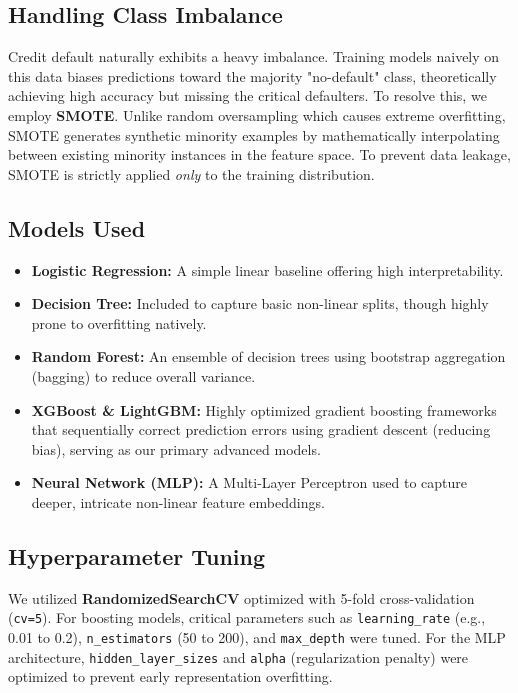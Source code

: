 \documentclass[12pt,a4paper]{article}
\begin{document}
\subsection{Handling Class Imbalance}
Credit default naturally exhibits a heavy imbalance. Training models naively on this data biases predictions toward the majority "no-default" class, theoretically achieving high accuracy but missing the critical defaulters. To resolve this, we employ \textbf{SMOTE}. Unlike random oversampling which causes extreme overfitting, SMOTE generates synthetic minority examples by mathematically interpolating between existing minority instances in the feature space. To prevent data leakage, SMOTE is strictly applied \textit{only} to the training distribution.

\subsection{Models Used}
\begin{itemize}
    \item \textbf{Logistic Regression:} A simple linear baseline offering high interpretability.
    \item \textbf{Decision Tree:} Included to capture basic non-linear splits, though highly prone to overfitting natively.
    \item \textbf{Random Forest:} An ensemble of decision trees using bootstrap aggregation (bagging) to reduce overall variance.
    \item \textbf{XGBoost \& LightGBM:} Highly optimized gradient boosting frameworks that sequentially correct prediction errors using gradient descent (reducing bias), serving as our primary advanced models.
    \item \textbf{Neural Network (MLP):} A Multi-Layer Perceptron used to capture deeper, intricate non-linear feature embeddings.
\end{itemize}

\subsection{Hyperparameter Tuning}
We utilized \textbf{RandomizedSearchCV} optimized with 5-fold cross-validation (\texttt{cv=5}). For boosting models, critical parameters such as \texttt{learning\_rate} (e.g., 0.01 to 0.2), \texttt{n\_estimators} (50 to 200), and \texttt{max\_depth} were tuned. For the MLP architecture, \texttt{hidden\_layer\_sizes} and \texttt{alpha} (regularization penalty) were optimized to prevent early representation overfitting.
\end{document}
